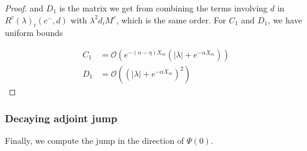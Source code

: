 \documentclass[thesis.tex]{subfiles}
\begin{document}
\begin{lemma}
\begin{proof}
and $D_1$ is the matrix we get from combining the terms involving $d$ in $R^c(\lambda)_i(c^-, d)$ with $\lambda^2 d_i M^c$, which is the same order. For $C_1$ and $D_1$, we have uniform bounds

\begin{align*}
C_1 &= \mathcal{O}(e^{-(\alpha - \eta) X_m}(|\lambda| + e^{-\alpha X_m})) \\
D_1 &= \mathcal{O}((|\lambda| + e^{-\alpha X_m})^2)
\end{align*}

\end{proof}
\end{lemma}

\subsubsection{Decaying adjoint jump}

Finally, we compute the jump in the direction of $\Psi(0)$.
\end{document}
